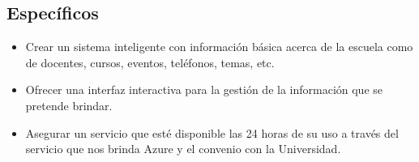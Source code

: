 \documentclass[12pt,letterpaper]{article}
\begin{document}
	\subsection{Específicos}
\begin{itemize}
	\item Crear un sistema inteligente con información básica acerca de la escuela como de docentes, cursos, eventos, teléfonos, temas, etc.
	\item Ofrecer una interfaz interactiva para la gestión de la información que se pretende brindar.
	\item Asegurar un servicio que esté disponible las 24 horas de su uso a través del servicio que nos brinda Azure y el convenio con la Universidad.
\end{itemize}



\end{document}
